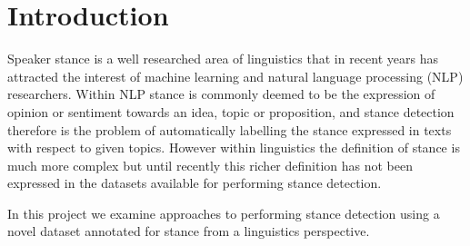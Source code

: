 \documentclass[Dissertation.tex]{subfiles}
\begin{document}
\chapter{Introduction}

Speaker stance is a well researched area of linguistics  that in recent years has attracted the interest of machine learning and natural language processing (NLP) researchers. Within NLP stance is commonly deemed to be the expression of opinion or sentiment towards an idea, topic or proposition, and stance detection therefore is the problem of automatically labelling the stance expressed in texts with respect to given topics. However within linguistics the definition of stance is much more complex but until recently this richer definition has not been expressed in the datasets available for performing stance detection.

In this project we examine approaches to performing stance detection using a novel dataset annotated for stance from a linguistics perspective. 
\end{document}
